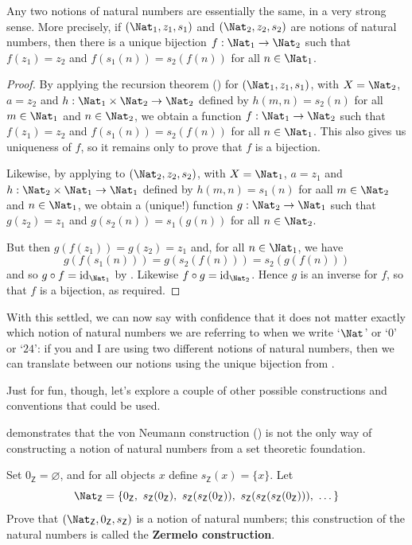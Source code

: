 \begin{theorem}
\label{thmNNNUnique}
Any two notions of natural numbers are essentially the same, in a very strong sense. More precisely, if $(\Nat_1, z_1, s_1)$ and $(\Nat_2, z_2, s_2)$ are notions of natural numbers, then there is a unique bijection $f : \Nat_1 \to \Nat_2$ such that $f(z_1) = z_2$ and $f(s_1(n)) = s_2(f(n))$ for all $n \in \Nat_1$.
\end{theorem}

\begin{proof}
By applying the recursion theorem () for $(\Nat_1, z_1, s_1)$, with $X = \Nat_2$, $a = z_2$ and $h : \Nat_1 \times \Nat_2 \to \Nat_2$ defined by $h(m,n) = s_2(n)$ for all $m \in \Nat_1$ and $n \in \Nat_2$, we obtain a function $f : \Nat_1 \to \Nat_2$ such that $f(z_1) = z_2$ and $f(s_1(n)) = s_2(f(n))$ for all $n \in \Nat_1$. This also gives us uniqueness of $f$, so it remains only to prove that $f$ is a bijection.

Likewise, by applying  to $(\Nat_2, z_2, s_2)$, with $X = \Nat_1$, $a = z_1$ and $h : \Nat_2 \times \Nat_1 \to \Nat_1$ defined by $h(m,n) = s_1(n)$ for aall $m \in \Nat_2$ and $n \in \Nat_1$, we obtain a (unique!) function $g : \Nat_2 \to \Nat_1$ such that $g(z_2) = z_1$ and $g(s_2(n)) = s_1(g(n))$ for all $n \in \Nat_2$.

But then $g(f(z_1)) = g(z_2) = z_1$ and, for all $n \in \Nat_1$, we have
\[ g(f(s_1(n))) = g(s_2(f(n))) = s_2(g(f(n))) \]
and so $g \circ f = \mathrm{id}_{\Nat_1}$ by . Likewise $f \circ g = \mathrm{id}_{\Nat_2}$. Hence $g$ is an inverse for $f$, so that $f$ is a bijection, as required.
\end{proof}

With this settled, we can now say with confidence that it does not matter exactly which notion of natural numbers we are referring to when we write `$\Nat$' or `$0$' or `$24$': if you and I are using two different notions of natural numbers, then we can translate between our notions using the unique bijection from .

Just for fun, though, let's explore a couple of other possible constructions and conventions that could be used.

 demonstrates that the von Neumann construction () is not the only way of constructing a notion of natural numbers from a set theoretic foundation.

\begin{exercise}
\label{exZermeloNaturalNumbers}
Set $0_{\mathsf{Z}} = \varnothing$, and for all objects $x$ define $s_{\mathsf{Z}}(x) = \{ x \}$. Let
\[ \Nat_{\mathsf{Z}} = \{ 0_{\mathsf{Z}},~ s_{\mathsf{Z}}(0_{\mathsf{Z}}),~ s_{\mathsf{Z}}(s_{\mathsf{Z}}(0_{\mathsf{Z}})),~ s_{\mathsf{Z}}(s_{\mathsf{Z}}(s_{\mathsf{Z}}(0_{\mathsf{Z}}))) ,~ \dots \} \]
Prove that $(\Nat_{\mathsf{Z}}, 0_{\mathsf{Z}}, s_{\mathsf{Z}})$ is a notion of natural numbers; this construction of the natural numbers is called the \textbf{Zermelo construction}.
\end{exercise}

